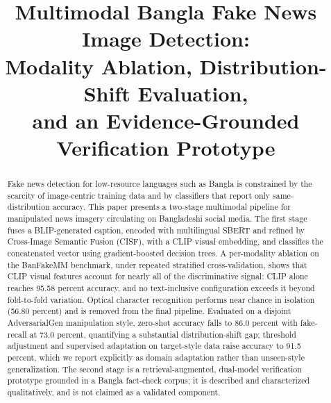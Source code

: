 \documentclass[conference,a4paper]{IEEEtran}
\begin{document}
\title{Multimodal Bangla Fake News Image Detection:\\
Modality Ablation, Distribution-Shift Evaluation,\\
and an Evidence-Grounded Verification Prototype}

\author{
}


\maketitle

\begin{abstract}
Fake news detection for low-resource languages such as Bangla is constrained
by the scarcity of image-centric training data and by classifiers that report
only same-distribution accuracy. This paper presents a two-stage multimodal
pipeline for manipulated news imagery circulating on Bangladeshi social media.
The first stage fuses a BLIP-generated caption, encoded with multilingual
SBERT and refined by Cross-Image Semantic Fusion (CISF), with a CLIP visual
embedding, and classifies the concatenated vector using gradient-boosted
decision trees. A per-modality ablation on the BanFakeMM benchmark, under
repeated stratified cross-validation, shows that CLIP visual features account
for nearly all of the discriminative signal: CLIP alone reaches 95.58 percent
accuracy, and no text-inclusive configuration exceeds it beyond fold-to-fold
variation. Optical character recognition performs near chance in isolation
(56.80 percent) and is removed from the final pipeline. Evaluated on a
disjoint AdversarialGen manipulation style, zero-shot accuracy falls to
86.0 percent with fake-recall at 73.0 percent, quantifying a substantial
distribution-shift gap; threshold adjustment and supervised adaptation on
target-style data raise accuracy to 91.5 percent, which we report explicitly
as domain adaptation rather than unseen-style generalization. The second stage
is a retrieval-augmented, dual-model verification prototype grounded in a
Bangla fact-check corpus; it is described and characterized qualitatively, and
is not claimed as a validated component.
\end{abstract}
\end{document}
